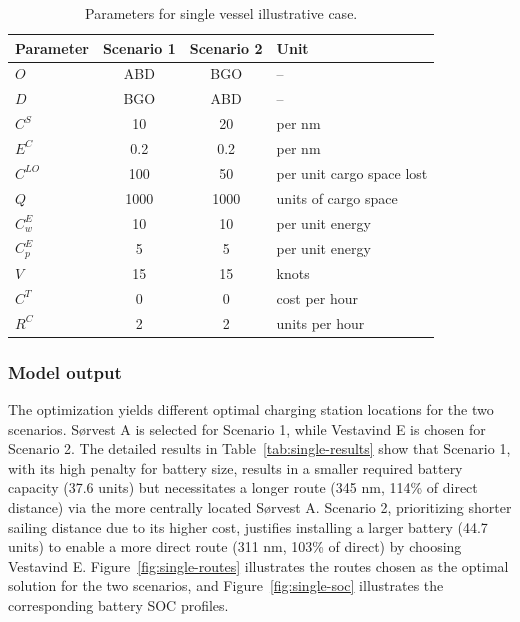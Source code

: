 \begin{table}[H]
\centering
\caption{Parameters for single vessel illustrative case.}
\label{tab:single-params}
\begin{tabular}{@{}lccl@{}}
\toprule
Parameter & Scenario 1 & Scenario 2 & Unit \\
\midrule
$O$          & ABD  & BGO  & -- \\
$D$          & BGO  & ABD  & -- \\
$C^{S}$      & 10   & 20   & per nm \\
$E^{C}$      & 0.2  & 0.2  & per nm \\
$C^{LO}$     & 100  & 50   & per unit cargo space lost \\
$Q$          & 1000 & 1000 & units of cargo space \\
$C^{E}_{w}$  & 10   & 10   & per unit energy \\
$C^{E}_{p}$  & 5    & 5    & per unit energy \\
$V$          & 15   & 15   & knots \\
$C^{T}$      & 0    & 0    & cost per hour \\
$R^{C}$      & 2    & 2    & units per hour \\
\bottomrule
\end{tabular}
\end{table}

\subsubsection*{Model output}

The optimization yields different optimal charging station locations for the two scenarios. Sørvest A is selected for Scenario 1, while Vestavind E is chosen for Scenario 2. The detailed results in Table~\ref{tab:single-results} show that Scenario 1, with its high penalty for battery size, results in a smaller required battery capacity (37.6 units) but necessitates a longer route (345 nm, 114\% of direct distance) via the more centrally located Sørvest A. Scenario 2, prioritizing shorter sailing distance due to its higher cost, justifies installing a larger battery (44.7 units) to enable a more direct route (311 nm, 103\% of direct) by choosing Vestavind E. Figure~\ref{fig:single-routes} illustrates the routes chosen as the optimal solution for the two scenarios, and Figure~\ref{fig:single-soc} illustrates the corresponding battery SOC profiles.

